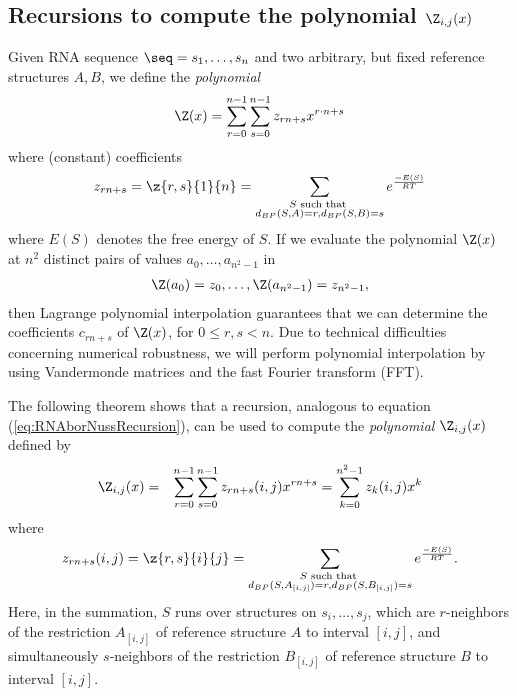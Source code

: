 \subsection{Recursions to compute the polynomial $\Z_{i,j}(x)$}
\label{section:recursionsForPolynomialZij}

Given RNA sequence $\seq = s_1,\ldots,s_n$
and two arbitrary, but fixed reference
structures $A,B$, we define the {\em polynomial}
\begin{eqnarray}
\label{eq:polynomialYann}
\Z(x) = \sum_{r=0}^{n-1} \sum_{s=0}^{n-1}  z_{rn+s} x^{r\cdot n + s}
\end{eqnarray}
where (constant) coefficients
\[ z_{rn+s}= \z{r,s}{1}{n} =
\sum_{\substack{S \text{ such that }\\
d_{BP}(S,A)=r, d_{BP}(S,B)=s}}
e^{\frac{-E(S)}{RT}}
\]
where $E(S)$ denotes the free energy of $S$.
If we evaluate the polynomial $\Z(x)$ at $n^2$ distinct pairs of values
$a_0,\ldots,a_{n^2-1}$ in
\begin{eqnarray}
\label{eq:ZofX}
\Z(a_{0}) = z_{0},\ldots, \Z(a_{n^2-1}) = z_{n^2-1},
\end{eqnarray}
then Lagrange polynomial interpolation
guarantees that we can determine the coefficients $c_{rn+s}$ of $\Z(x)$,
for $0\leq r,s < n$. Due to technical difficulties concerning numerical
robustness, we will perform polynomial interpolation by using Vandermonde
matrices and the fast Fourier transform (FFT).

The following theorem shows that a
recursion, analogous to equation (\ref{eq:RNAborNussRecursion}),
can be used to compute
the {\em polynomial} $\Z_{i,j}(x)$ defined by
\begin{eqnarray}
\label{eq:defZijpolynomial}
\Z_{i,j}(x) &=& \sum_{r=0}^{n-1} \sum_{s=0}^{n-1}
z_{rn+s}(i,j) x^{rn+s}
=\sum_{k=0}^{n^2-1} z_{k}(i,j) x^{k}
\end{eqnarray}
where
\[ z_{rn+s}(i,j)= \z{r,s}{i}{j} =
\sum_{\substack{S \text{ such that }\\
d_{BP}(S,A_{[i,j]})=r, d_{BP}(S,B_{[i,j]})=s}}
e^{\frac{-E(S)}{RT}}.
\]
Here, in the summation, $S$ runs over structures on $s_i,\ldots,s_j$, which
are $r$-neighbors of the restriction $A_{[i,j]}$ of reference structure
$A$ to interval $[i,j]$, and simultaneously
$s$-neighbors of the restriction $B_{[i,j]}$ of reference structure
$B$ to interval $[i,j]$.
\medskip

